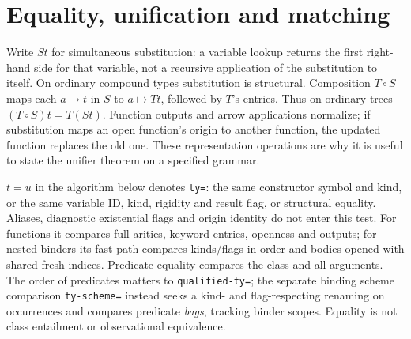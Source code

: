 \documentclass[11pt]{article}
\theoremstyle{definition}
\newcommand{\src}[1]{\nolinkurl{#1}}
\begin{document}
\section{Equality, unification and matching}\label{sec:unification}

Write $St$ for simultaneous substitution: a variable lookup returns the
first right-hand side for that variable, not a recursive application of
the substitution to itself. On ordinary compound types substitution is
structural. Composition $T\circ S$ maps each $a\mapsto t$ in $S$ to
$a\mapsto Tt$, followed by $T$'s entries. Thus on ordinary trees
$(T\circ S)t=T(St)$. Function outputs and arrow applications normalize;
if substitution maps an open function's origin to another function, the
updated function replaces the old one. These representation operations are
why it is useful to state the unifier theorem on a specified grammar.

$t=u$ in the algorithm below denotes \src{ty=}: the same constructor
symbol and kind, or the same variable ID, kind, rigidity and result flag,
or structural equality. Aliases, diagnostic existential flags and origin
identity do not enter this test. For functions it compares full arities,
keyword entries, openness and outputs; for nested binders its fast path
compares kinds/flags in order and bodies opened with shared fresh indices.
Predicate equality compares the class and all arguments. The order of
predicates matters to \src{qualified-ty=}; the separate binding scheme
comparison \src{ty-scheme=} instead seeks a kind- and flag-respecting
renaming on occurrences and compares predicate \emph{bags}, tracking binder
scopes. Equality is not class entailment or observational equivalence.
\end{document}
